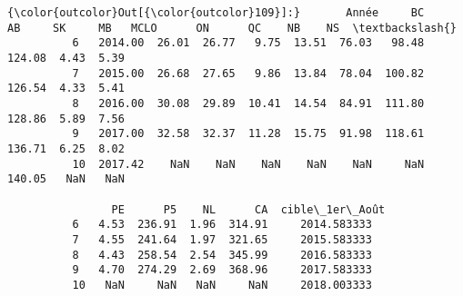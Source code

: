\documentclass[11pt]{article}
\begin{document}
\begin{Verbatim}[commandchars=\\\{\}]
{\color{outcolor}Out[{\color{outcolor}109}]:}       Année     BC     AB     SK     MB   MCLO      ON      QC    NB    NS  \textbackslash{}
          6   2014.00  26.01  26.77   9.75  13.51  76.03   98.48  124.08  4.43  5.39   
          7   2015.00  26.68  27.65   9.86  13.84  78.04  100.82  126.54  4.33  5.41   
          8   2016.00  30.08  29.89  10.41  14.54  84.91  111.80  128.86  5.89  7.56   
          9   2017.00  32.58  32.37  11.28  15.75  91.98  118.61  136.71  6.25  8.02   
          10  2017.42    NaN    NaN    NaN    NaN    NaN     NaN  140.05   NaN   NaN   
          
                PE      P5    NL      CA  cible\_1er\_Août  
          6   4.53  236.91  1.96  314.91     2014.583333  
          7   4.55  241.64  1.97  321.65     2015.583333  
          8   4.43  258.54  2.54  345.99     2016.583333  
          9   4.70  274.29  2.69  368.96     2017.583333  
          10   NaN     NaN   NaN     NaN     2018.003333  
\end{Verbatim}
            
\end{document}
